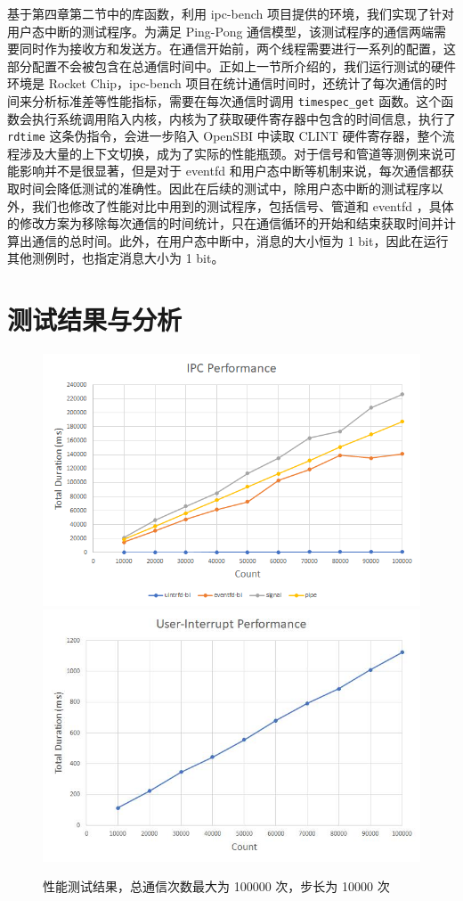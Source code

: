 基于第四章第二节中的库函数，利用 ipc-bench 项目提供的环境，我们实现了针对用户态中断的测试程序。为满足 Ping-Pong 通信模型，该测试程序的通信两端需要同时作为接收方和发送方。在通信开始前，两个线程需要进行一系列的配置，这部分配置不会被包含在总通信时间中。正如上一节所介绍的，我们运行测试的硬件环境是 Rocket Chip，ipc-bench 项目在统计通信时间时，还统计了每次通信的时间来分析标准差等性能指标，需要在每次通信时调用 \texttt{timespec\_get} 函数。这个函数会执行系统调用陷入内核，内核为了获取硬件寄存器中包含的时间信息，执行了 \texttt{rdtime} 这条伪指令，会进一步陷入 OpenSBI 中读取 CLINT 硬件寄存器，整个流程涉及大量的上下文切换，成为了实际的性能瓶颈。对于信号和管道等测例来说可能影响并不是很显著，但是对于 eventfd 和用户态中断等机制来说，每次通信都获取时间会降低测试的准确性。因此在后续的测试中，除用户态中断的测试程序以外，我们也修改了性能对比中用到的测试程序，包括信号、管道和 eventfd ，具体的修改方案为移除每次通信的时间统计，只在通信循环的开始和结束获取时间并计算出通信的总时间。此外，在用户态中断中，消息的大小恒为 1 bit，因此在运行其他测例时，也指定消息大小为 1 bit。

\section{测试结果与分析}

\begin{figure}
    \centering
        {\includegraphics[width=0.45\linewidth]{figures/bench1.jpg}}
        {\includegraphics[width=0.45\linewidth]{figures/bench2.jpg}}
    \caption{性能测试结果，总通信次数最大为 100000 次，步长为 10000 次}
    \label{fig:bench-total}
\end{figure}

